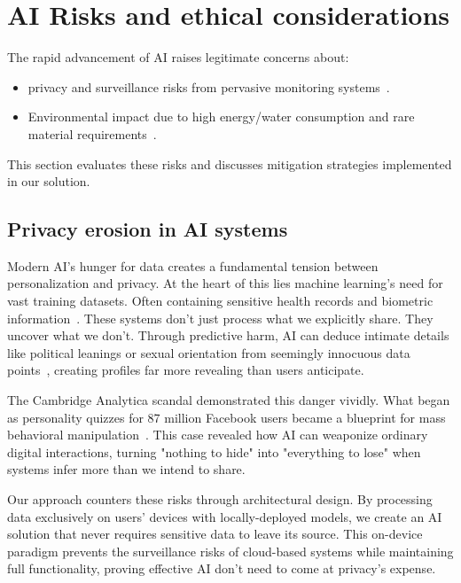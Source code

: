 \documentclass[licencjacka,en]{pracamgr}
\begin{document}
\section{AI Risks and ethical considerations}

The rapid advancement of AI raises legitimate concerns about:
\begin{itemize}
    \item privacy and surveillance risks from pervasive monitoring systems~\cite{not_sroka_vid, ai_scare2, ai_scare3}.
    \item Environmental impact due to high energy/water consumption and rare material requirements~\cite{ai_env_concerns}.
\end{itemize}

This section evaluates these risks and discusses mitigation strategies implemented in our solution.

\subsection{Privacy erosion in AI systems}
Modern AI's hunger for data creates a fundamental tension between personalization and privacy. At the heart of this lies machine learning's need for vast training datasets. Often containing sensitive health records and biometric information~\cite{ibm_vast_data, data_guard}. These systems don't just process what we explicitly share. They uncover what we don't. Through predictive harm, AI can deduce intimate details like political leanings or sexual orientation from seemingly innocuous data points~\cite{transcend}, creating profiles far more revealing than users anticipate.

The Cambridge Analytica scandal demonstrated this danger vividly. What began as personality quizzes for 87 million Facebook users became a blueprint for mass behavioral manipulation~\cite{transcend}. This case revealed how AI can weaponize ordinary digital interactions, turning "nothing to hide" into "everything to lose" when systems infer more than we intend to share.

Our approach counters these risks through architectural design. By processing data exclusively on users' devices with locally-deployed models, we create an AI solution that never requires sensitive data to leave its source. This on-device paradigm prevents the surveillance risks of cloud-based systems while maintaining full functionality, proving effective AI don't need to come at privacy's expense.
\end{document}
